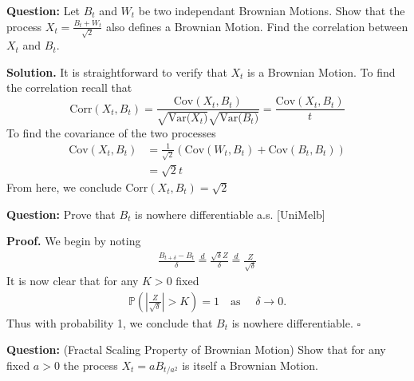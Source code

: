 \documentclass{article}
\begin{document}
\begin{tcolorbox}[colframe=black,colback=gray!5,boxrule=0.5pt]
\textbf{Question:} Let $B_t$ and $W_t$ be two independant Brownian Motions. Show that the process $X_t = \frac{B_t + W_t}{\sqrt{2}}$ also defines a Brownian Motion. Find the correlation between $X_t$ and $B_t$. 
\end{tcolorbox}
\textbf{Solution.} It is straightforward to verify that $X_t$ is a Brownian Motion. To find the correlation recall that 
$$\text{Corr}(X_t, B_t) = \frac{\text{Cov}(X_t, B_t)}{\sqrt{\text{Var($X_t$)}}\sqrt{\text{Var($B_t$)}}} = \frac{\text{Cov}(X_t, B_t)}{t}$$
To find the covariance of the two processes
\begin{align*}
    \text{Cov}(X_t ,B_t) &= \frac{1}{\sqrt{2}}(\text{Cov}(W_t, B_t) + \text{Cov}(B_t, B_t))  \\
    &= \sqrt{2}t
\end{align*}
From here, we conclude Corr$(X_t, B_t) = \sqrt{2}$

\begin{tcolorbox}[colframe=black,colback=gray!5,boxrule=0.5pt]
\textbf{Question:} Prove that $B_t$ is nowhere differentiable a.s. [UniMelb]  
\end{tcolorbox}
\textbf{Proof.} We begin by noting 
\begin{align*}
    \frac{B_{t+\delta} - B_t}{\delta} \stackrel{d}{=} \frac{\sqrt{\delta} Z}{\delta} \stackrel{d}{=} \frac{Z}{\sqrt{\delta}}
\end{align*}
It is now clear that for any $K > 0$ fixed
\begin{align*}
    \mathbb{P}\left(\left|\frac{Z}{\sqrt{\delta}}\right| > K \right) =1 \quad \text{as } \quad \delta\to0. 
\end{align*}
Thus with probability 1, we conclude that $B_t$ is nowhere differentiable. $\square$

\begin{tcolorbox}[colframe=black,colback=gray!5,boxrule=0.5pt]
\textbf{Question:} (Fractal Scaling Property of Brownian Motion) Show that for any fixed $a>0$  the process $X_t = aB_{t/a^2}$ is itself a Brownian Motion.  
\end{tcolorbox}


\newpage
 
\end{document}
